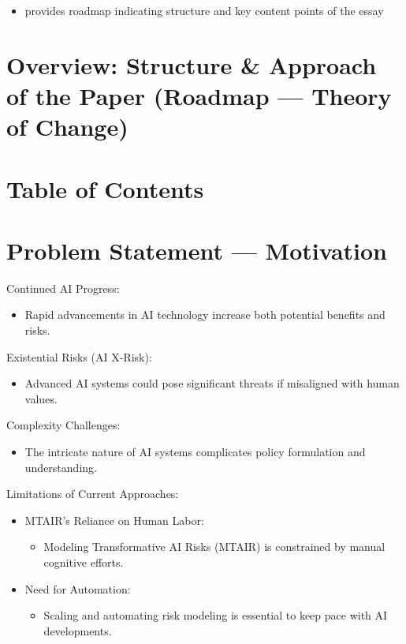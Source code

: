 \documentclass[
  letterpaper,
]{book}
\providecommand{\tightlist}{%
  \setlength{\itemsep}{0pt}\setlength{\parskip}{0pt}}
\begin{document}
\begin{itemize}
\tightlist
\item
  provides roadmap indicating structure and key content points of the
  essay
\end{itemize}

\section{Overview: Structure \& Approach of the Paper (Roadmap ---
Theory of
Change)}\label{overview-structure-approach-of-the-paper-roadmap-theory-of-change}

\section{Table of Contents}\label{table-of-contents}

\section{Problem Statement ---
Motivation}\label{problem-statement-motivation}

Continued AI Progress:

\begin{itemize}
\tightlist
\item
  Rapid advancements in AI technology increase both potential benefits
  and risks.
\end{itemize}

Existential Risks (AI X-Risk):

\begin{itemize}
\tightlist
\item
  Advanced AI systems could pose significant threats if misaligned with
  human values.
\end{itemize}

Complexity Challenges:

\begin{itemize}
\tightlist
\item
  The intricate nature of AI systems complicates policy formulation and
  understanding.
\end{itemize}

Limitations of Current Approaches:

\begin{itemize}
\tightlist
\item
  MTAIR's Reliance on Human Labor:

  \begin{itemize}
  \tightlist
  \item
    Modeling Transformative AI Risks (MTAIR) is constrained by manual
    cognitive efforts.\\
  \end{itemize}
\item
  Need for Automation:

  \begin{itemize}
  \tightlist
  \item
    Scaling and automating risk modeling is essential to keep pace with
    AI developments.
  \end{itemize}
\end{itemize}
\end{document}
